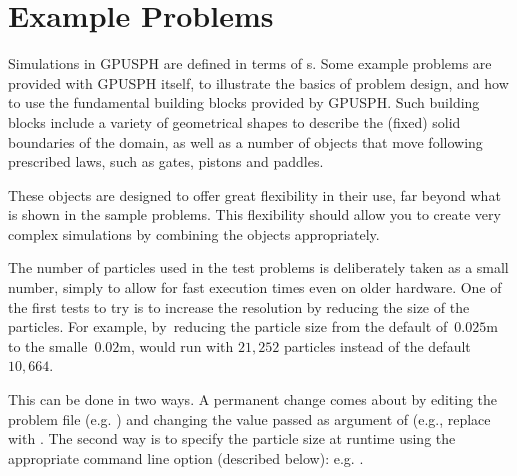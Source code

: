 \documentclass[12pt]{memoir}
\begin{document}
\section{Example Problems}

Simulations in GPUSPH are defined in terms of s. Some
example problems are provided with GPUSPH itself, to illustrate the
basics of problem design, and how to use the fundamental building blocks
provided by GPUSPH. Such building blocks include a variety of
geometrical shapes to describe the (fixed) solid boundaries of the
domain, as well as a number of objects that move following prescribed
laws, such as gates, pistons and paddles.

These objects are designed to offer great flexibility in their use, far
beyond what is shown in the sample problems. This flexibility should
allow you to create very complex simulations by combining the objects
appropriately.

\iffalse
GPUSPH has options for specified moving objects, which are used to make
piston and paddle wavemakers and a moving gate. These objects are
comprised of particles that are distinguished by identifying their type
as GATEPART, PISTONPART, and PADDLEPART. (Water is distinguished by
FLUIDPART and fixed boundary particles are of type BOUNDPART.) The
distinction between GATEPART and PISTONPART is that the particles of the
GATE are moved by providing an arbitrary (possibly time-varying)
velocity vector in the problem's callback function and a PISTONPART
particle is moved by providing a displacement for the vertical piston in
(only the) x direction with time, again via the callback function.
\else
{}
\fi

The number of particles used in the test problems is deliberately taken
as a small number, simply to allow for fast execution times even on
older hardware. One of the first tests to try is to increase the
resolution by reducing the size of the particles. For example,
by~reducing the particle size from the default of~$0.025$m to the
smalle~$0.02$m,  would run with $21,252$ particles
instead of the default $10,664$.

This can be done in two ways. A permanent change comes about by editing
the problem file (e.g. ) and changing the value
passed as argument of  (e.g., replace
 with . The second way
is to specify the particle size at runtime using the appropriate command
line option (described below): e.g. .
\end{document}
